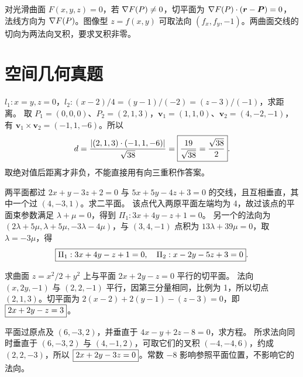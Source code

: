 对光滑曲面 $F(x,y,z)=0$，若 $\nabla F(P)\ne0$，切平面为 $\nabla F(P)\cdot(\bm r-\bm P)=0$，法线方向为 $\nabla F(P)$。图像型 $z=f(x,y)$ 可取法向 $(f_x,f_y,-1)$。两曲面交线的切向为两法向叉积，要求叉积非零。

\section{空间几何真题}
$l_1:x=y,z=0$，$l_2:(x-2)/4=(y-1)/(-2)=(z-3)/(-1)$，求距离。
\sol 取 $P_1=(0,0,0)$、$P_2=(2,1,3)$，$\bm v_1=(1,1,0)$、$\bm v_2=(4,-2,-1)$，有 $\bm v_1\times\bm v_2=(-1,1,-6)$。所以
\[d=\frac{|(2,1,3)\cdot(-1,1,-6)|}{\sqrt{38}}=\boxed{\frac{19}{\sqrt{38}}=\frac{\sqrt{38}}2}.\]
取绝对值后距离才非负，不能直接用有向三重积作答案。

两平面都过 $2x+y-3z+2=0$ 与 $5x+5y-4z+3=0$ 的交线，且互相垂直，其中一个过 $(4,-3,1)$。求二平面。
\sol 该点代入两原平面左端均为 4，故过该点的平面束参数满足 $\lambda+\mu=0$，得到 $\Pi_1:3x+4y-z+1=0$。
另一个的法向为 $(2\lambda+5\mu,\lambda+5\mu,-3\lambda-4\mu)$，与 $(3,4,-1)$ 点积为 $13\lambda+39\mu=0$，取 $\lambda=-3\mu$，得
\[\boxed{\Pi_1:3x+4y-z+1=0,\quad\Pi_2:x-2y-5z+3=0}.\]

求曲面 $z=x^2/2+y^2$ 上与平面 $2x+2y-z=0$ 平行的切平面。
\sol 法向 $(x,2y,-1)$ 与 $(2,2,-1)$ 平行，因第三分量相同，比例为 1，所以切点 $(2,1,3)$。切平面为 $2(x-2)+2(y-1)-(z-3)=0$，即 $\boxed{2x+2y-z=3}$。

平面过原点及 $(6,-3,2)$，并垂直于 $4x-y+2z-8=0$，求方程。
\sol 所求法向同时垂直于 $(6,-3,2)$ 与 $(4,-1,2)$，可取它们的叉积 $(-4,-4,6)$，约成 $(2,2,-3)$，所以 $\boxed{2x+2y-3z=0}$。常数 $-8$ 影响参照平面位置，不影响它的法向。
